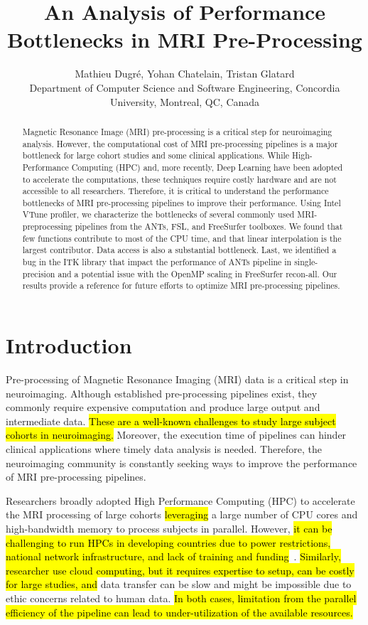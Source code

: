 \documentclass[conference]{IEEEtran}
\title{An Analysis of Performance Bottlenecks in MRI Pre-Processing}
\author{Mathieu Dugr\'e, Yohan Chatelain, Tristan Glatard\\Department of Computer Science and Software Engineering, Concordia University, Montreal, QC, Canada}
\newcommand{\HL}[1]{\hl{#1}}
\begin{document}
\maketitle

\begin{abstract}
	Magnetic Resonance Image (MRI) pre-processing is a critical step for neuroimaging analysis. However, the computational cost of MRI pre-processing pipelines is a major bottleneck for large cohort studies and some clinical applications. While High-Performance Computing (HPC) and, more recently, Deep Learning have been adopted to accelerate the computations, these techniques require costly hardware and are not accessible to all researchers. Therefore, it is critical to understand the performance bottlenecks of MRI pre-processing pipelines to improve their performance. Using Intel VTune profiler, we characterize the bottlenecks of several commonly used MRI-preprocessing pipelines from the ANTs, FSL, and FreeSurfer toolboxes. We found that few functions contribute to most of the CPU time, and that linear interpolation is the largest contributor. Data access is also  a substantial bottleneck. Last, we identified a bug in the ITK library that impact the performance of ANTs pipeline in single-precision and a potential issue with the OpenMP scaling in FreeSurfer recon-all. Our results provide a reference for future efforts to optimize MRI pre-processing pipelines.
\end{abstract}

\section{Introduction}
Pre-processing of Magnetic Resonance Imaging (MRI) data is a critical step in neuroimaging. Although established pre-processing pipelines exist, they commonly require expensive computation and produce large output and intermediate data. \HL{These are a well-known challenges to study large subject cohorts in neuroimaging.} Moreover, the execution time of pipelines can hinder clinical applications where timely data analysis is needed. Therefore, the neuroimaging community is constantly seeking ways to improve the performance of MRI pre-processing pipelines.

Researchers broadly adopted High Performance Computing (HPC) to accelerate the MRI processing of large cohorts \HL{leveraging} a large number of CPU cores and high-bandwidth memory to process subjects in parallel. However, \HL{it can be challenging to run HPCs in developing countries due to power restrictions, national network infrastructure, and lack of training and funding}~\cite{NRG-SC23}. \HL{Similarly, researcher use cloud computing, but it requires expertise to setup, can be costly for large studies, and} data transfer can be slow and might be impossible due to ethic concerns related to human data. \HL{In both cases, limitation from the parallel efficiency of the pipeline can lead to under-utilization of the available resources.}
\end{document}
